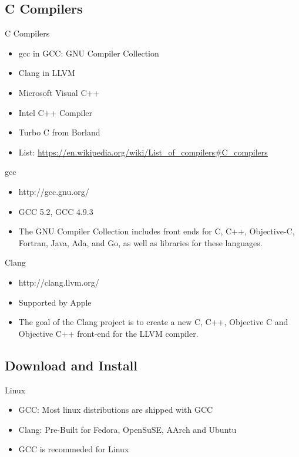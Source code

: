 \documentclass[UTF8]{beamer}
\begin{document}
\subsection{C Compilers}
\begin{frame}[t]{C Compilers}
    \begin{itemize}
        \item gcc in GCC: GNU Compiler Collection
        \item Clang in LLVM
        \item Microsoft Visual C++
        \item Intel C++ Compiler
        \item Turbo C from Borland
        \item List: \url{https://en.wikipedia.org/wiki/List_of_compilers\#C_compilers}
    \end{itemize}
\end{frame}

\begin{frame}[t]{gcc}
    \begin{itemize}
        \item http://gcc.gnu.org/
        \item GCC 5.2, GCC 4.9.3
        \item The GNU Compiler Collection includes front ends for C, C++, Objective-C, Fortran, Java, Ada, and Go, as well as libraries for these languages.
    \end{itemize}

\end{frame}

\begin{frame}[t]{Clang}
    \begin{itemize}
        \item http://clang.llvm.org/
        \item Supported by Apple
        \item The goal of the Clang project is to create a new C, C++, Objective C and Objective C++ front-end for the LLVM compiler.
    \end{itemize}
\end{frame}

\subsection{Download and Install}
\begin{frame}[t]{Linux}
    \begin{itemize}
        \item GCC: Most linux distributions are shipped with GCC
        \item Clang: Pre-Built for Fedora, OpenSuSE, AArch and Ubuntu
        \item GCC is recommeded for Linux
    \end{itemize}
\end{frame}
\end{document}
